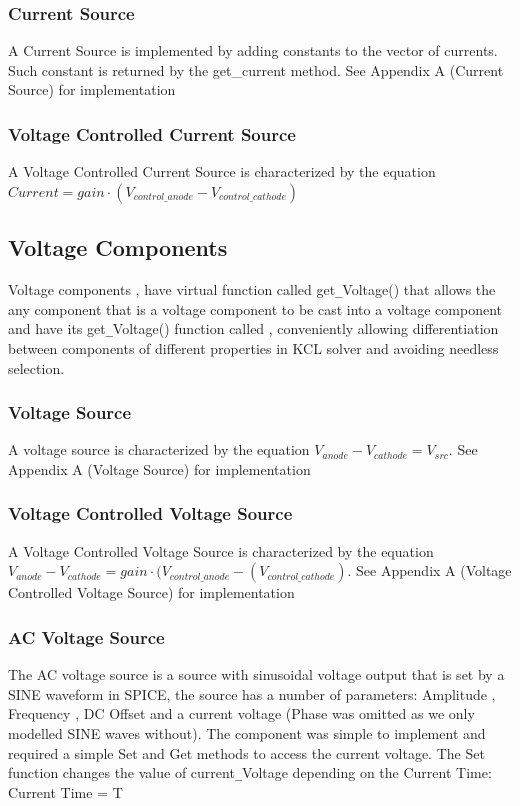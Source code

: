 \documentclass{article}
\begin{document}
\subsubsection{Current Source}
A Current Source is implemented by adding constants to the vector of currents. Such constant is returned by the get\_current method.\bigbreak
See Appendix A (Current Source) for implementation
\subsubsection{Voltage Controlled Current Source}
A Voltage Controlled Current Source is characterized by the equation $ Current = gain\cdot(V_{control\_anode}-V_{control\_cathode})$
\subsection{Voltage Components}
Voltage components , have virtual function called get\verb|_|Voltage() that allows the any component that is a voltage component to be cast into a voltage component and have its get\verb|_|Voltage() function called , conveniently allowing differentiation between components of different properties in KCL solver and avoiding needless selection.
\medbreak

\subsubsection{Voltage Source}
A voltage source is characterized by the equation $V_{anode}-V_{cathode}=V_{src}$. \bigbreak
See Appendix A (Voltage Source) for implementation

\subsubsection{Voltage Controlled Voltage Source}
A Voltage Controlled Voltage Source is characterized by the equation
$V_{anode}-V_{cathode}=gain\cdot(V_{control\_anode}-(V_{control\_cathode})$.
\bigbreak
See Appendix A (Voltage Controlled Voltage Source) for implementation


\subsubsection{AC Voltage Source}
The AC voltage source is a source with sinusoidal voltage output that is set by a SINE waveform in SPICE, the source has a number of parameters: Amplitude , Frequency , DC Offset and a current voltage (Phase was omitted as we only modelled SINE waves without). The component was simple to implement and required a simple Set and Get methods to access the current voltage. 
The Set function changes the value of current\verb|_|Voltage depending on the Current Time: Current Time = T
\medbreak
\end{document}
